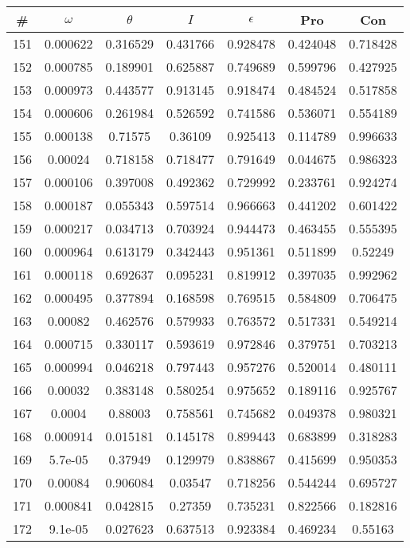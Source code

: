 \newpage
\begin{table}
\begin{tabular}{c|c|c|c|c|c|c}
\# & $\omega$ & $\theta$ & $I$ & $\epsilon$ & Pro & Con\\
\hline
151 & 0.000622 & 0.316529 & 0.431766 & 0.928478 & 0.424048 & 0.718428\\
152 & 0.000785 & 0.189901 & 0.625887 & 0.749689 & 0.599796 & 0.427925\\
153 & 0.000973 & 0.443577 & 0.913145 & 0.918474 & 0.484524 & 0.517858\\
154 & 0.000606 & 0.261984 & 0.526592 & 0.741586 & 0.536071 & 0.554189\\
155 & 0.000138 & 0.71575 & 0.36109 & 0.925413 & 0.114789 & 0.996633\\
156 & 0.00024 & 0.718158 & 0.718477 & 0.791649 & 0.044675 & 0.986323\\
157 & 0.000106 & 0.397008 & 0.492362 & 0.729992 & 0.233761 & 0.924274\\
158 & 0.000187 & 0.055343 & 0.597514 & 0.966663 & 0.441202 & 0.601422\\
159 & 0.000217 & 0.034713 & 0.703924 & 0.944473 & 0.463455 & 0.555395\\
160 & 0.000964 & 0.613179 & 0.342443 & 0.951361 & 0.511899 & 0.52249\\
161 & 0.000118 & 0.692637 & 0.095231 & 0.819912 & 0.397035 & 0.992962\\
162 & 0.000495 & 0.377894 & 0.168598 & 0.769515 & 0.584809 & 0.706475\\
163 & 0.00082 & 0.462576 & 0.579933 & 0.763572 & 0.517331 & 0.549214\\
164 & 0.000715 & 0.330117 & 0.593619 & 0.972846 & 0.379751 & 0.703213\\
165 & 0.000994 & 0.046218 & 0.797443 & 0.957276 & 0.520014 & 0.480111\\
166 & 0.00032 & 0.383148 & 0.580254 & 0.975652 & 0.189116 & 0.925767\\
167 & 0.0004 & 0.88003 & 0.758561 & 0.745682 & 0.049378 & 0.980321\\
168 & 0.000914 & 0.015181 & 0.145178 & 0.899443 & 0.683899 & 0.318283\\
169 & 5.7e-05 & 0.37949 & 0.129979 & 0.838867 & 0.415699 & 0.950353\\
170 & 0.00084 & 0.906084 & 0.03547 & 0.718256 & 0.544244 & 0.695727\\
171 & 0.000841 & 0.042815 & 0.27359 & 0.735231 & 0.822566 & 0.182816\\
172 & 9.1e-05 & 0.027623 & 0.637513 & 0.923384 & 0.469234 & 0.55163\\

\end{tabular}
\end{table}
